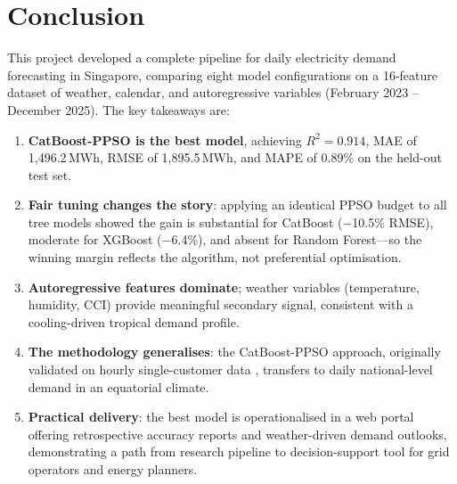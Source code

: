 \section{Conclusion}\label{sec:conclusion}

This project developed a complete pipeline for daily electricity demand forecasting in Singapore, comparing eight model configurations on a 16-feature dataset of weather, calendar, and autoregressive variables (February 2023 -- December 2025). The key takeaways are:

\begin{enumerate}
    \item \textbf{CatBoost-PPSO is the best model}, achieving $R^2 = 0.914$, MAE of 1{,}496.2\,MWh, RMSE of 1{,}895.5\,MWh, and MAPE of 0.89\% on the held-out test set.
    \item \textbf{Fair tuning changes the story}: applying an identical PPSO budget to all tree models showed the gain is substantial for CatBoost ($-$10.5\% RMSE), moderate for XGBoost ($-$6.4\%), and absent for Random Forest---so the winning margin reflects the algorithm, not preferential optimisation.
    \item \textbf{Autoregressive features dominate}; weather variables (temperature, humidity, CCI) provide meaningful secondary signal, consistent with a cooling-driven tropical demand profile.
    \item \textbf{The methodology generalises}: the CatBoost-PPSO approach, originally validated on hourly single-customer data \parencite{zhang2023catboostppso}, transfers to daily national-level demand in an equatorial climate.
    \item \textbf{Practical delivery}: the best model is operationalised in a web portal offering retrospective accuracy reports and weather-driven demand outlooks, demonstrating a path from research pipeline to decision-support tool for grid operators and energy planners.
\end{enumerate}
